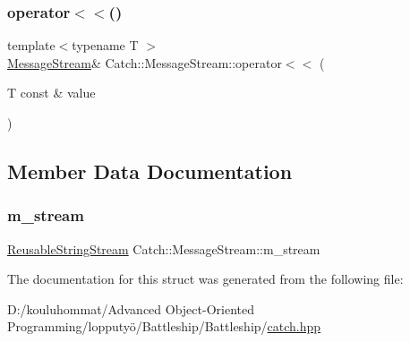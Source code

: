 \subsubsection{\texorpdfstring{operator$<$$<$()}{operator<<()}}
{\footnotesize\ttfamily template$<$typename T $>$ \\
\mbox{\hyperlink{struct_catch_1_1_message_stream}{Message\+Stream}}\& Catch\+::\+Message\+Stream\+::operator$<$$<$ (\begin{DoxyParamCaption}\item[{T const \&}]{value }\end{DoxyParamCaption})\hspace{0.3cm}{\ttfamily [inline]}}



\subsection{Member Data Documentation}
\mbox{\label{struct_catch_1_1_message_stream_a9202520faed8882ef469db9f353ec578}} 
\subsubsection{\texorpdfstring{m\+\_\+stream}{m\_stream}}
{\footnotesize\ttfamily \mbox{\hyperlink{class_catch_1_1_reusable_string_stream}{Reusable\+String\+Stream}} Catch\+::\+Message\+Stream\+::m\+\_\+stream}



The documentation for this struct was generated from the following file\+:\begin{DoxyCompactItemize}
\item 
D\+:/kouluhommat/\+Advanced Object-\/\+Oriented Programming/lopputyö/\+Battleship/\+Battleship/\mbox{\hyperlink{catch_8hpp}{catch.\+hpp}}\end{DoxyCompactItemize}
